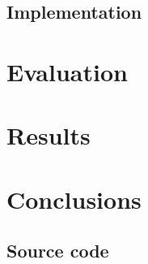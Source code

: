 \documentclass{scrreprt}
\begin{document}

\cite{Kordy2012}


\section{Implementation}

\chapter{Evaluation}



\chapter{Results}

\chapter{Conclusions}




\newpage
\begin{appendices}

\chapter{Source code}

\end{appendices}
\end{document}
